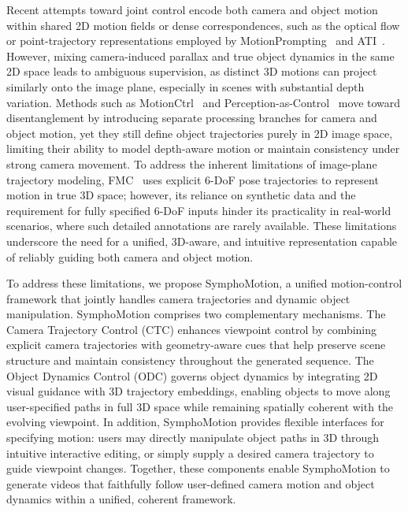 Recent attempts toward joint control encode both camera and object motion within shared 2D motion fields or dense correspondences, such as the optical flow or point-trajectory representations employed by MotionPrompting~\cite{geng2025motion} and ATI~\cite{wang2025ati}. However, mixing camera-induced parallax and true object dynamics in the same 2D space leads to ambiguous supervision, as distinct 3D motions can project similarly onto the image plane, especially in scenes with substantial depth variation. Methods such as MotionCtrl~\cite{wang2024motionctrl} and Perception-as-Control~\cite{chen2025perception} move toward disentanglement by introducing separate processing branches for camera and object motion, yet they still define object trajectories purely in 2D image space, limiting their ability to model depth-aware motion or maintain consistency under strong camera movement. To address the inherent limitations of image-plane trajectory modeling, FMC~\cite{shuai2025free} uses explicit 6-DoF pose trajectories to represent motion in true 3D space; however, its reliance on synthetic data and the requirement for fully specified 6-DoF inputs hinder its practicality in real-world scenarios, where such detailed annotations are rarely available. These limitations underscore the need for a unified, 3D-aware, and intuitive representation capable of reliably guiding both camera and object motion.

To address these limitations, we propose SymphoMotion, a unified motion-control framework that jointly handles camera trajectories and dynamic object manipulation. SymphoMotion comprises two complementary mechanisms. The Camera Trajectory Control (CTC) enhances viewpoint control by combining explicit camera trajectories with geometry-aware cues that help preserve scene structure and maintain consistency throughout the generated sequence. The Object Dynamics Control (ODC) governs object dynamics by integrating 2D visual guidance with 3D trajectory embeddings, enabling objects to move along user-specified paths in full 3D space while remaining spatially coherent with the evolving viewpoint. In addition, SymphoMotion provides flexible interfaces for specifying motion: users may directly manipulate object paths in 3D through intuitive interactive editing, or simply supply a desired camera trajectory to guide viewpoint changes. Together, these components enable SymphoMotion to generate videos that faithfully follow user-defined camera motion and object dynamics within a unified, coherent framework.

